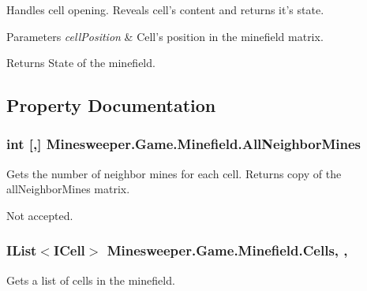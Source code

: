 Handles cell opening. Reveals cell's content and returns it's state. 


\begin{DoxyParams}{Parameters}
{\em cell\+Position} & Cell's position in the minefield matrix.\\
\hline
\end{DoxyParams}
\begin{DoxyReturn}{Returns}
State of the minefield.
\end{DoxyReturn}


\subsection{Property Documentation}
\hypertarget{class_minesweeper_1_1_game_1_1_minefield_a6b62b86faae0edee06d71b14790661f1}{
\subsubsection[{All\+Neighbor\+Mines}]{\setlength{\rightskip}{0pt plus 5cm}int \mbox{[},\mbox{]} Minesweeper.\+Game.\+Minefield.\+All\+Neighbor\+Mines\hspace{0.3cm}{\ttfamily [get]}}}\label{class_minesweeper_1_1_game_1_1_minefield_a6b62b86faae0edee06d71b14790661f1}


Gets the number of neighbor mines for each cell. Returns copy of the all\+Neighbor\+Mines matrix. 

Not accepted.\hypertarget{class_minesweeper_1_1_game_1_1_minefield_a6308163a3dc8ed1f5681de4bbd184788}{
\subsubsection[{Cells}]{\setlength{\rightskip}{0pt plus 5cm}I\+List$<${\bf I\+Cell}$>$ Minesweeper.\+Game.\+Minefield.\+Cells\hspace{0.3cm}{\ttfamily [get]}, {\ttfamily [set]}, {\ttfamily [protected]}}}\label{class_minesweeper_1_1_game_1_1_minefield_a6308163a3dc8ed1f5681de4bbd184788}


Gets a list of cells in the minefield. 

